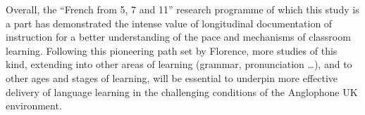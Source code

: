 \documentclass[output=paper]{langscibook}
\begin{document}
Overall, the ``French from 5, 7 and 11'' research programme of which this study is a part has demonstrated the intense value of longitudinal documentation of instruction for a better understanding of the pace and mechanisms of classroom learning. Following this pioneering path set by Florence, more studies of this kind, extending into other areas of learning (grammar, pronunciation \ldots), and to other ages and stages of learning, will be essential to underpin more effective delivery of language learning in the challenging conditions of the Anglophone UK environment.

\printbibliography[heading=subbibliography,notkeyword=this]
\end{document}
